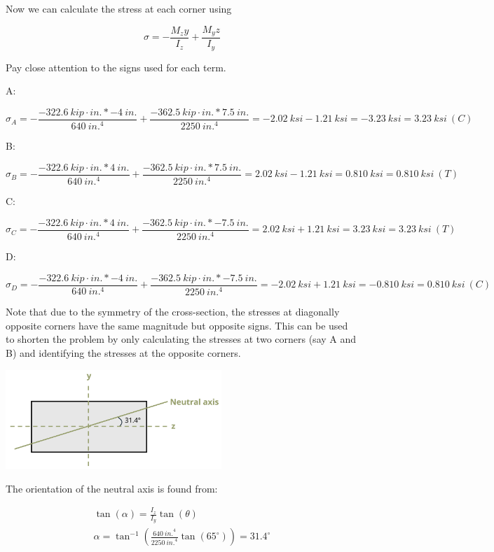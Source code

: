 \documentclass[
  letterpaper,
  DIV=11,
  numbers=noendperiod]{scrreprt}
\begin{document}
\begin{tcolorbox}
\begin{tcolorbox}
Now we can calculate the stress at each corner using

\[
\sigma=-\frac{M_z y}{I_z}+\frac{M_y z}{I_y}
\]

Pay close attention to the signs used for each term.

A:

\[
\sigma_A=-\frac{-322.6{~kip}\cdot{in.} *-4{~in.}}{640{~in.}^4}+\frac{-362.5{~kip}\cdot{in.} * 7.5{~in.}}{2250{~in.}^4}=-2.02{~ksi}-1.21{~ksi}=-3.23{~ksi}=3.23{~ksi}~(C)
\]

B:

\[
\sigma_B=-\frac{-322.6{~kip}\cdot{in.} * 4{~in.}}{640{~in.}^4}+\frac{-362.5{~kip}\cdot{in.} * 7.5{~in.}}{2250{~in.}^4}=2.02{~ksi}-1.21{~ksi}=0.810{~ksi}=0.810{~ksi }~(T)
\]

C:

\[
\sigma_C=-\frac{-322.6{~kip}\cdot{in.} * 4{~in.}}{640{~in.}^4}+\frac{-362.5{~kip}\cdot{in.} *-7.5{~in.}}{2250{~in.}^4}=2.02{~ksi}+1.21{~ksi}=3.23{~ksi}=3.23{~ksi}~(T)
\]

D:

\[
\sigma_D=-\frac{-322.6{~kip}\cdot{in.} *-4{~in.}}{640{~in.^4}}+\frac{-362.5{~kip}\cdot{in.} *-7.5{~in.}}{2250{~in.}^4}=-2.02{~ksi}+1.21{~ksi}=-0.810{~ksi}=0.810{~ksi}~(C)
\]

Note that due to the symmetry of the cross-section, the stresses at
diagonally opposite corners have the same magnitude but opposite signs.
This can be used to shorten the problem by only calculating the stresses
at two corners (say A and B) and identifying the stresses at the
opposite corners.

\begin{center}
\includegraphics[width=3.20833in,height=\textheight]{images/CH9 PNGs/Example 9.5 part 2.png}
\end{center}

The orientation of the neutral axis is found from:

\[
\begin{gathered}
\tan (\alpha)=\frac{I_z}{I_y} \tan (\theta) \\
\alpha=\tan ^{-1}\left(\frac{640{~in.}^4}{2250{~in.}^4} \tan \left(65^{\circ}\right)\right)=31.4^{\circ}
\end{gathered}
\]

\end{tcolorbox}

\end{tcolorbox}
\end{document}

